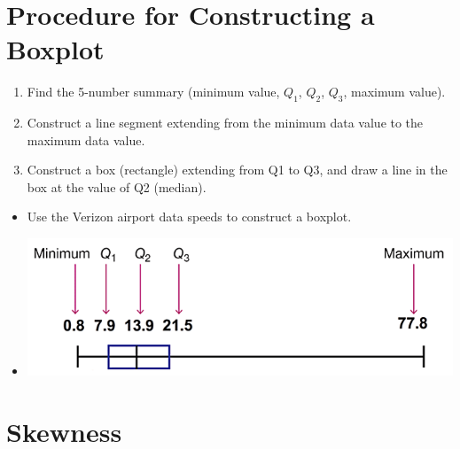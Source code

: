 \documentclass[]{book}
\providecommand{\tightlist}{%
  \setlength{\itemsep}{0pt}\setlength{\parskip}{0pt}}
\begin{document}
\hypertarget{procedure-for-constructing-a-boxplot}{%
\section{Procedure for Constructing a Boxplot}\label{procedure-for-constructing-a-boxplot}}

\begin{enumerate}
\def\labelenumi{\arabic{enumi}.}
\tightlist
\item
  Find the 5-number summary (minimum value, \(Q_1\), \(Q_2\), \(Q_3\), maximum value).
\item
  Construct a line segment extending from the minimum data value to the maximum data value.
\item
  Construct a box (rectangle) extending from Q1 to Q3, and draw a line in the box at the value of Q2 (median).
\end{enumerate}

\begin{itemize}
\tightlist
\item
  Use the Verizon airport data speeds to construct a boxplot.
\item
  \includegraphics{pic15.png}
\end{itemize}

\hypertarget{skewness}{%
\section{Skewness}\label{skewness}}
\end{document}
